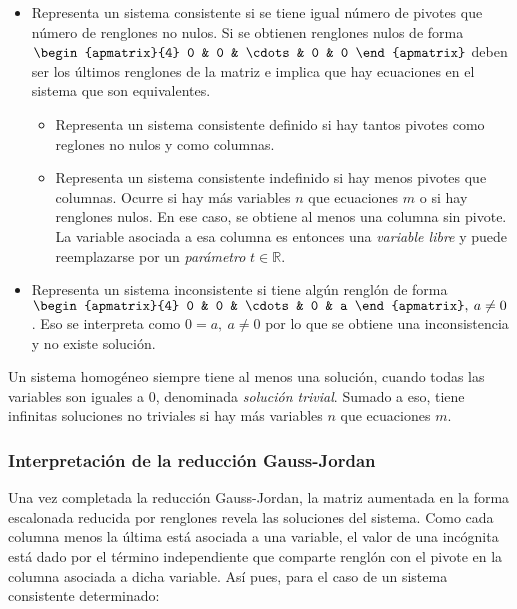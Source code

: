 \documentclass{fmbnotes}
\begin{document}
\begin{itemize}
\item Representa un sistema consistente si se tiene igual número de pivotes que número de renglones no nulos. Si se obtienen renglones nulos de forma \(\begin{apmatrix}{4} 0 & 0 & \cdots & 0 & 0 \end{apmatrix}\) deben ser los últimos renglones de la matriz e implica que hay ecuaciones en el sistema que son equivalentes. 
\begin{itemize}
\item Representa un sistema consistente definido si hay tantos pivotes como reglones no nulos y como columnas.
\item Representa un sistema consistente indefinido si hay menos pivotes que columnas. Ocurre si hay más variables \(n\) que ecuaciones \(m\) o si hay renglones nulos. En ese caso, se obtiene al menos una columna sin pivote. La variable asociada a esa columna es entonces una \emph{variable libre} y puede reemplazarse por un \emph{parámetro} \(t \in \mathbb{R}\). 
\end{itemize}
\item Representa un sistema inconsistente si tiene algún renglón de forma \(\begin{apmatrix}{4} 0 & 0 & \cdots & 0 & a \end{apmatrix}, \: a \neq 0\). Eso se interpreta como \(0=a,\: a\neq 0\) por lo que se obtiene una inconsistencia y no existe solución.
\end{itemize}

Un sistema homogéneo siempre tiene al menos una solución, cuando todas las variables son iguales a 0, denominada \emph{solución trivial}. Sumado a eso, tiene infinitas soluciones no triviales si hay más variables \(n\) que ecuaciones \(m\).

\subsubsection{Interpretación de la reducción Gauss-Jordan}

Una vez completada la reducción Gauss-Jordan, la matriz aumentada en la forma escalonada reducida por renglones revela las soluciones del sistema. Como cada columna menos la última está asociada a una variable, el valor de una incógnita está dado por el término independiente que comparte renglón con el pivote en la columna asociada a dicha variable. Así pues, para el caso de un sistema consistente determinado:
\end{document}

